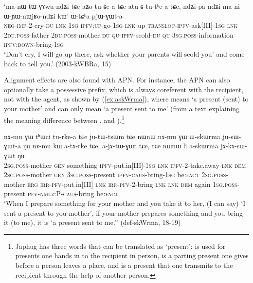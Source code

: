 \begin{exe}
\ex \label{ex:WtCha.pjWGWta}
\gll `ma-nɯ-tɯ-ɣɤwu-ndʑi tɕe aʑo tu-ɕe-a tɕe atu ɕ-tu-tʰe-a tɕe,
ndʑi-pa ndʑi-ma ni ɯ-ɲɯ-nɯjʁo-ndʑi kɯ' ɯ-tɕʰa pjɯ-ɣɯt-a \\
\textsc{neg}-\textsc{imp}-2-cry-\textsc{du} \textsc{lnk} \textsc{1sg} \textsc{ipfv}:\textsc{up}-go-\textsc{1sg} \textsc{lnk} up \textsc{transloc}-\textsc{ipfv}-ask[III]-\textsc{1sg} \textsc{lnk} \textsc{2du}.\textsc{poss}-father \textsc{2du}.\textsc{poss}-mother \textsc{du} \textsc{qu}-\textsc{ipfv}-scold-\textsc{du} \textsc{qu} \textsc{3sg}.\textsc{poss}-information \textsc{ipfv}:\textsc{down}-bring-\textsc{1sg} \\
\glt `Don't cry, I will go up there, ask whether your parents will scold you' and come back to tell you.' (2003-kWBRa, 15)
\end{exe}

Alignment effects are also found with APN. For instance, the APN  can also optionally take a possessive prefix, which is always coreferent with the recipient, not with the agent, as shown by (\ref{ex:askWrma}), where  means `a present (sent) to your mother' and  can only mean `a present sent to me' (from a text explaining the meaning difference between ,  and ).\footnote{Japhug has three words that can be translated as `present':  is used for presents one hands in to the recipient in person,  is a parting present one gives before a person leaves a place, and  is a present that one transmits to the recipient through the help of another person.}

\begin{exe}
\ex \label{ex:askWrma}
\gll nɤ-mu ɣɯ tʰɯci tu-rke-a tɕe ju-tɯ-tsɯm tɕe nɯnɯ nɤ-mu ɣɯ ɯ-skɯrma ju-sɯ-ɣɯt-a ŋu nɤ-mu kɯ a-tɤ-rke tɕe, a-jɤ-tɯ-ɣɯt tɕe, tɕe nɯnɯ li a-skɯrma jɤ-kɤ-sɯ-ɣɯt ŋu \\
\textsc{2sg}.\textsc{poss}-mother \textsc{gen} something \textsc{ipfv}-put.in[III]-\textsc{1sg} \textsc{lnk} \textsc{ipfv}-2-take.away \textsc{lnk} \textsc{dem} \textsc{2sg}.\textsc{poss}-mother \textsc{gen} \textsc{3sg}.\textsc{poss}-present  \textsc{ipfv}-\textsc{caus}-bring-\textsc{1sg} be:\textsc{fact} \textsc{2sg}.\textsc{poss}-mother  \textsc{erg} \textsc{irr}-\textsc{pfv}-put.in[III] \textsc{lnk} \textsc{irr}-\textsc{pfv}-2-bring \textsc{lnk} \textsc{lnk} \textsc{dem} again \textsc{1sg}.\textsc{poss}-present \textsc{pfv}-\textsc{nmlz}:P-\textsc{caus}-bring be:\textsc{fact} \\
\glt `When I prepare something for your mother and you take it to her, (I can say) `I sent a present to you mother', if your mother prepares something and you bring it (to me), it is `a present sent to me.'' (def-skWrma, 18-19)
\end{exe}
